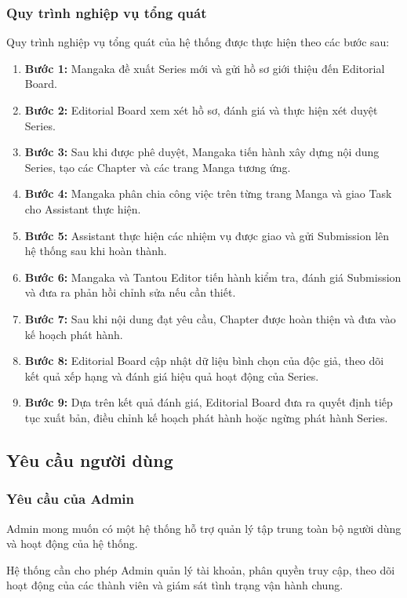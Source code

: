 \documentclass[12pt,a4paper]{article}
\begin{document}
\subsubsection{Quy trình nghiệp vụ tổng quát}
Quy trình nghiệp vụ tổng quát của hệ thống được thực hiện theo các bước sau:
\begin{enumerate}
    \item \textbf{Bước 1:} Mangaka đề xuất Series mới và gửi hồ sơ giới thiệu đến Editorial Board.
    \item \textbf{Bước 2:} Editorial Board xem xét hồ sơ, đánh giá và thực hiện xét duyệt Series.
    \item \textbf{Bước 3:} Sau khi được phê duyệt, Mangaka tiến hành xây dựng nội dung Series, tạo các Chapter và các trang Manga tương ứng.
    \item \textbf{Bước 4:} Mangaka phân chia công việc trên từng trang Manga và giao Task cho Assistant thực hiện.
    \item \textbf{Bước 5:} Assistant thực hiện các nhiệm vụ được giao và gửi Submission lên hệ thống sau khi hoàn thành.
    \item \textbf{Bước 6:} Mangaka và Tantou Editor tiến hành kiểm tra, đánh giá Submission và đưa ra phản hồi chỉnh sửa nếu cần thiết.
    \item \textbf{Bước 7:} Sau khi nội dung đạt yêu cầu, Chapter được hoàn thiện và đưa vào kế hoạch phát hành.
    \item \textbf{Bước 8:} Editorial Board cập nhật dữ liệu bình chọn của độc giả, theo dõi kết quả xếp hạng và đánh giá hiệu quả hoạt động của Series.
    \item \textbf{Bước 9:} Dựa trên kết quả đánh giá, Editorial Board đưa ra quyết định tiếp tục xuất bản, điều chỉnh kế hoạch phát hành hoặc ngừng phát hành Series.
\end{enumerate}

\subsection{Yêu cầu người dùng}

\subsubsection{Yêu cầu của Admin}
Admin mong muốn có một hệ thống hỗ trợ quản lý tập trung toàn bộ người dùng và hoạt động của hệ thống.

Hệ thống cần cho phép Admin quản lý tài khoản, phân quyền truy cập, theo dõi hoạt động của các thành viên và giám sát tình trạng vận hành chung.
\end{document}

